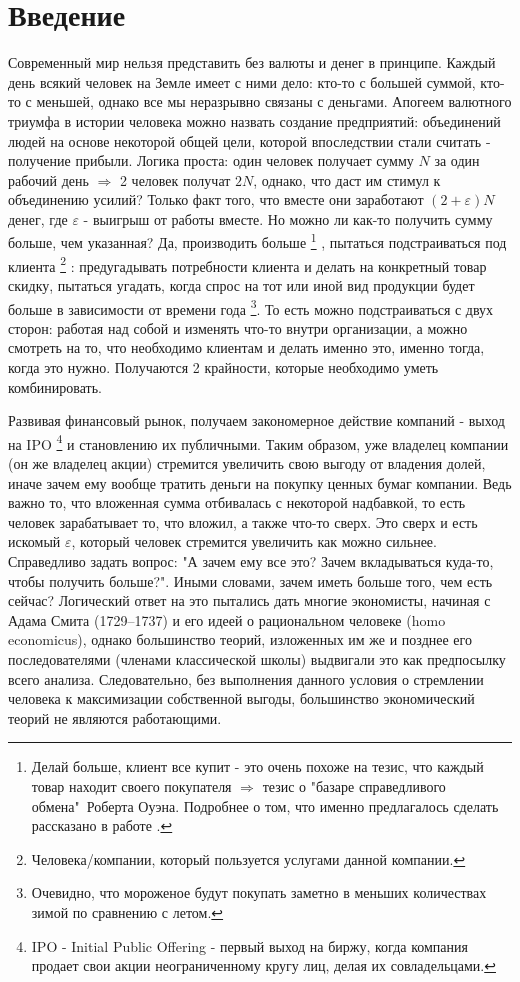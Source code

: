 \section{Введение} 
	Современный мир нельзя представить без валюты и денег в принципе. Каждый день всякий человек на Земле имеет с ними дело: кто-то с большей суммой, кто-то с меньшей, однако все мы неразрывно связаны с деньгами. Апогеем валютного триумфа в истории человека можно назвать создание предприятий: объединений людей на основе некоторой общей цели, которой впоследствии стали считать - получение прибыли. Логика проста: один человек получает сумму $N$ за один рабочий день $\Rightarrow$ 2 человек получат $2N$, однако, что даст им стимул к объединению усилий? Только факт того, что вместе они заработают $(2 + \varepsilon)N$ денег, где $\varepsilon$ - выигрыш от работы вместе. Но можно ли как-то получить сумму больше, чем указанная? Да, производить больше \footnote{Делай больше, клиент все купит - это очень похоже на тезис, что каждый товар находит своего покупателя $\Rightarrow$ тезис о "базаре справедливого обмена"\ Роберта Оуэна. Подробнее о том, что именно предлагалось сделать рассказано в работе \cite{ropert_ouwen}.} , пытаться подстраиваться под клиента \footnote{Человека/компании, который пользуется услугами данной компании.} : предугадывать потребности клиента и делать на конкретный товар скидку, пытаться угадать, когда спрос на тот или иной вид продукции будет больше в зависимости от времени года \footnote{Очевидно, что мороженое будут покупать заметно в меньших количествах зимой по сравнению с летом.}. То есть можно подстраиваться с двух сторон: работая над собой и изменять что-то внутри организации, а можно смотреть на то, что необходимо клиентам и делать именно это, именно тогда, когда это нужно. Получаются 2 крайности, которые необходимо уметь комбинировать. 
	
	Развивая финансовый рынок, получаем закономерное действие компаний - выход на IPO \footnote{IPO - Initial Public Offering - первый выход на биржу, когда компания продает свои акции неограниченному кругу лиц, делая их совладельцами.} и становлению их публичными. Таким образом, уже владелец компании (он же владелец акции) стремится увеличить свою выгоду от владения долей, иначе зачем ему вообще тратить деньги на покупку ценных бумаг компании. Ведь важно то, что вложенная сумма отбивалась с некоторой надбавкой, то есть человек зарабатывает то, что вложил, а также что-то сверх. Это сверх и есть искомый $\varepsilon$, который человек стремится увеличить как можно сильнее. Справедливо задать вопрос: "А зачем ему все это? Зачем вкладываться куда-то, чтобы получить больше?". Иными словами, зачем иметь больше того, чем есть сейчас? Логический ответ на это пытались дать многие экономисты, начиная с Адама Смита (1729–1737) \cite{adam_smith} и его идеей о рациональном человеке (homo economicus), однако большинство теорий, изложенных им же и позднее его последователями (членами классической школы) выдвигали это как предпосылку всего анализа. Следовательно, без выполнения данного условия о стремлении человека к максимизации собственной выгоды, большинство экономический теорий не являются работающими. 
	
